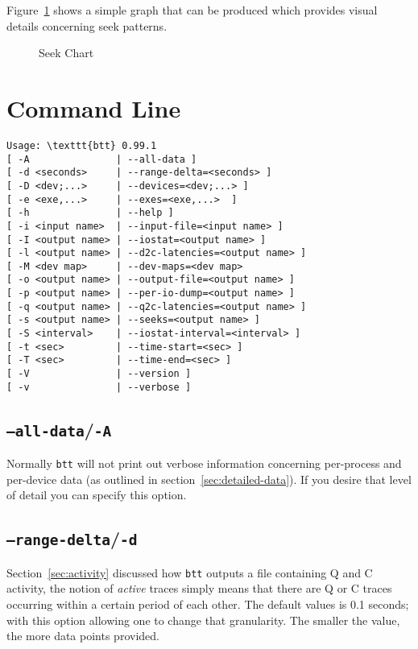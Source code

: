 \documentclass{article}
\begin{document}
  Figure~\ref{fig:seek} shows a simple graph that can be produced which
  provides visual details concerning seek patterns.

  \begin{figure}[h!]
  \leavevmode\centering
  \caption{\label{fig:seek}Seek Chart}
  \end{figure}

\newpage\section{\label{sec:cmd-line}Command Line}

\begin{verbatim}
Usage: \texttt{btt} 0.99.1 
[ -A               | --all-data ]
[ -d <seconds>     | --range-delta=<seconds> ]
[ -D <dev;...>     | --devices=<dev;...> ]
[ -e <exe,...>     | --exes=<exe,...>  ]
[ -h               | --help ]
[ -i <input name>  | --input-file=<input name> ]
[ -I <output name> | --iostat=<output name> ]
[ -l <output name> | --d2c-latencies=<output name> ]
[ -M <dev map>     | --dev-maps=<dev map>
[ -o <output name> | --output-file=<output name> ]
[ -p <output name> | --per-io-dump=<output name> ]
[ -q <output name> | --q2c-latencies=<output name> ]
[ -s <output name> | --seeks=<output name> ]
[ -S <interval>    | --iostat-interval=<interval> ]
[ -t <sec>         | --time-start=<sec> ]
[ -T <sec>         | --time-end=<sec> ]
[ -V               | --version ]
[ -v               | --verbose ]
\end{verbatim}

\subsection{\label{sec:o-A}\texttt{--all-data}/\texttt{-A}}

  Normally \texttt{btt} will not print out verbose information
  concerning per-process and per-device data (as outlined in
  section~\ref{sec:detailed-data}). If you desire that level of 
  detail you can specify this option.

\subsection{\label{sec:o-d}\texttt{--range-delta}/\texttt{-d}}

  Section~\ref{sec:activity} discussed how \texttt{btt} outputs a file
  containing Q and C activity, the notion of \emph{active} traces simply
  means that there are Q or C traces occurring within a certain period
  of each other. The default values is 0.1 seconds; with this option
  allowing one to change that granularity. The smaller the value, the
  more data points provided.
\end{document}
